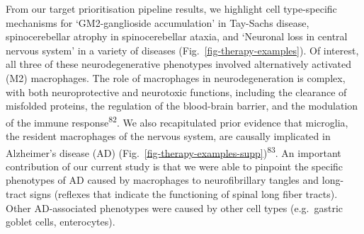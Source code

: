 \documentclass[
]{article}
\begin{document}
From our target prioritisation pipeline results, we highlight cell
type-specific mechanisms for `GM2-ganglioside accumulation' in Tay-Sachs
disease, spinocerebellar atrophy in spinocerebellar ataxia, and
`Neuronal loss in central nervous system' in a variety of diseases
(Fig.~\ref{fig-therapy-examples}). Of interest, all three of these
neurodegenerative phenotypes involved alternatively activated (M2)
macrophages. The role of macrophages in neurodegeneration is complex,
with both neuroprotective and neurotoxic functions, including the
clearance of misfolded proteins, the regulation of the blood-brain
barrier, and the modulation of the immune response\textsuperscript{82}.
We also recapitulated prior evidence that microglia, the resident
macrophages of the nervous system, are causally implicated in
Alzheimer's disease (AD)
(Fig.~\ref{fig-therapy-examples-supp})\textsuperscript{83}. An important
contribution of our current study is that we were able to pinpoint the
specific phenotypes of AD caused by macrophages to neurofibrillary
tangles and long-tract signs (reflexes that indicate the functioning of
spinal long fiber tracts). Other AD-associated phenotypes were caused by
other cell types (e.g.~gastric goblet cells, enterocytes).
\end{document}
